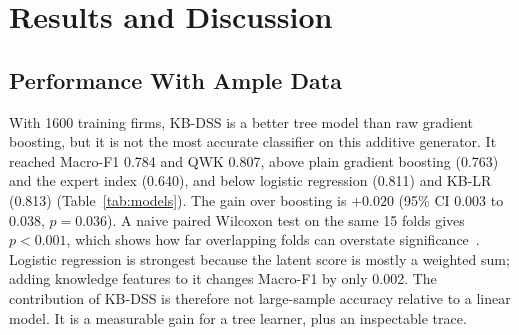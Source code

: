\documentclass[10pt,journal,compsoc]{IEEEtran}
\begin{document}
\section{Results and Discussion}

\subsection{Performance With Ample Data}

With 1600 training firms, KB-DSS is a better tree model than raw gradient boosting, but it is not the most accurate classifier on this additive generator. It reached Macro-F1 0.784 and QWK 0.807, above plain gradient boosting (0.763) and the expert index (0.640), and below logistic regression (0.811) and KB-LR (0.813) (Table~\ref{tab:models}). The gain over boosting is \(+0.020\) (95\% CI \(0.003\) to \(0.038\), \(p=0.036\)). A naive paired Wilcoxon test on the same 15 folds gives \(p<0.001\), which shows how far overlapping folds can overstate significance~\cite{nadeau2003,demsar2006}. Logistic regression is strongest because the latent score is mostly a weighted sum; adding knowledge features to it changes Macro-F1 by only 0.002. The contribution of KB-DSS is therefore not large-sample accuracy relative to a linear model. It is a measurable gain for a tree learner, plus an inspectable trace.
\end{document}
